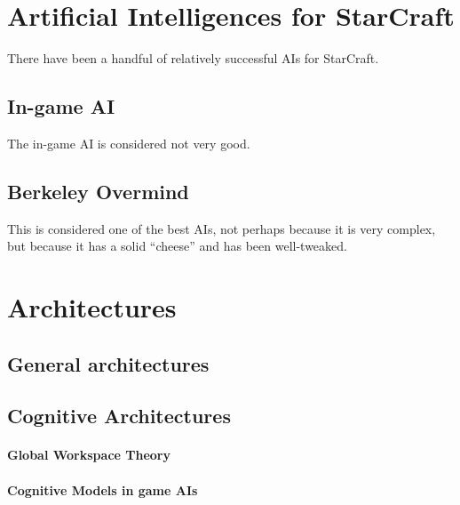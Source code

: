 \section{Artificial Intelligences for StarCraft}
There have been a handful of relatively successful AIs for StarCraft.

\subsection{In-game AI}
The in-game AI is considered not very good.

\subsection{Berkeley Overmind}
This is considered one of the best AIs, not perhaps because it is very complex,
but because it has a solid ``cheese'' and has been well-tweaked.


\section{Architectures}
\subsection{General architectures}
\subsubsection{}
\subsection{Cognitive Architectures}
\paragraph{Global Workspace Theory}
\paragraph{Cognitive Models in game AIs}
\cite{Arrabales2009}
